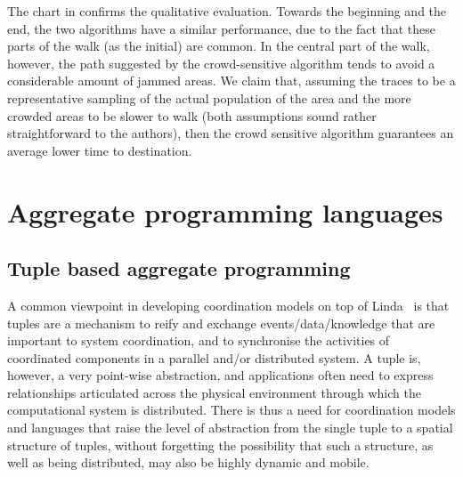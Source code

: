 \documentclass[12pt,a4paper,twoside,openright]{book}
\begin{document}
The chart in  confirms the qualitative evaluation.
%
Towards the beginning and the end, the two algorithms have a similar performance, due to the fact that these parts of the walk (as the initial) are common.
%
In the central part of the walk, however, the path suggested by the crowd-sensitive algorithm tends to avoid a considerable amount of jammed areas.
%
We claim that, assuming the traces to be a representative sampling of the actual population of the area and the more crowded areas to be slower to walk (both assumptions sound rather straightforward to the authors), then the crowd sensitive algorithm guarantees an average lower time to destination.

\part{Aggregate programming languages}
\label{aggregate-programming-part}
\chapter{Tuple based aggregate programming}

A common viewpoint in developing coordination models on top of Linda~\cite{linda-toplas7} is that tuples are a mechanism to reify and exchange events/data/knowledge that are important to system coordination, and to synchronise the activities of coordinated components in a parallel and/or distributed system.
%
A tuple is, however, a very point-wise abstraction, and applications often need to express relationships articulated across the physical environment through which the computational system is distributed.
%
There is thus a need for coordination models and languages that raise the level of abstraction from the single tuple to a spatial structure of tuples, without forgetting the possibility that such a structure, as well as being distributed, may also be highly dynamic and mobile.
\end{document}

